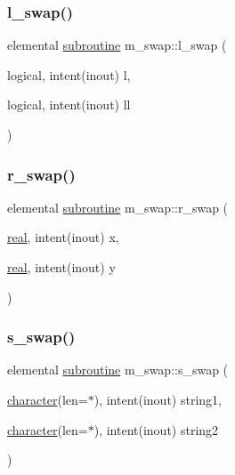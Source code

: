\mbox{\label{namespacem__swap_a3d204834a7c6cea08aef9387c680a90e}} 
\subsubsection{\texorpdfstring{l\+\_\+swap()}{l\_swap()}}
{\footnotesize\ttfamily elemental \hyperlink{M__stopwatch_83_8txt_acfbcff50169d691ff02d4a123ed70482}{subroutine} m\+\_\+swap\+::l\+\_\+swap (\begin{DoxyParamCaption}\item[{logical, intent(inout)}]{l,  }\item[{logical, intent(inout)}]{ll }\end{DoxyParamCaption})\hspace{0.3cm}{\ttfamily [private]}}

\mbox{\label{namespacem__swap_a8404b842cf10433585d21bddb67c0269}} 
\subsubsection{\texorpdfstring{r\+\_\+swap()}{r\_swap()}}
{\footnotesize\ttfamily elemental \hyperlink{M__stopwatch_83_8txt_acfbcff50169d691ff02d4a123ed70482}{subroutine} m\+\_\+swap\+::r\+\_\+swap (\begin{DoxyParamCaption}\item[{\hyperlink{read__watch_83_8txt_abdb62bde002f38ef75f810d3a905a823}{real}, intent(inout)}]{x,  }\item[{\hyperlink{read__watch_83_8txt_abdb62bde002f38ef75f810d3a905a823}{real}, intent(inout)}]{y }\end{DoxyParamCaption})\hspace{0.3cm}{\ttfamily [private]}}

\mbox{\label{namespacem__swap_a10156a985cf314b706164ec3f773bd0f}} 
\subsubsection{\texorpdfstring{s\+\_\+swap()}{s\_swap()}}
{\footnotesize\ttfamily elemental \hyperlink{M__stopwatch_83_8txt_acfbcff50169d691ff02d4a123ed70482}{subroutine} m\+\_\+swap\+::s\+\_\+swap (\begin{DoxyParamCaption}\item[{\hyperlink{option__stopwatch_83_8txt_abd4b21fbbd175834027b5224bfe97e66}{character}(len=$\ast$), intent(inout)}]{string1,  }\item[{\hyperlink{option__stopwatch_83_8txt_abd4b21fbbd175834027b5224bfe97e66}{character}(len=$\ast$), intent(inout)}]{string2 }\end{DoxyParamCaption})\hspace{0.3cm}{\ttfamily [private]}}

